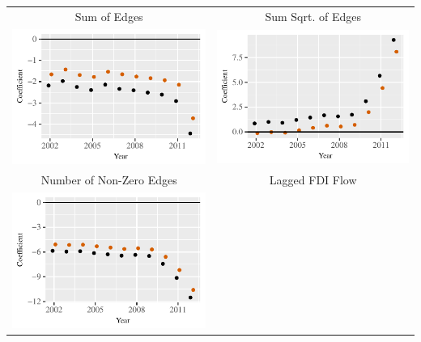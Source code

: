 \documentclass[reqno,onecolumn,letterpaper,12pt]{article}
\begin{document}
\begin{longtable}{c@{\hskip -.4cm}c}
Sum of Edges&
Sum Sqrt. of Edges\\
\includegraphics[height=.2\textheight, clip=true, trim=0cm .5cm 0cm .1cm]{draft_figures/rl_plots/Sum.pdf}    &
\includegraphics[height=.2\textheight, clip=true, trim=.5cm .5cm 0cm .1cm]{draft_figures/rl_plots/Sum_5.pdf}   \\
Number of Non-Zero Edges &
Lagged FDI Flow\\
\includegraphics[height=.2\textheight, clip=true, trim=0cm .5cm 0cm .1cm]{draft_figures/rl_plots/Nonzero.pdf} &

\end{longtable}
\end{document}
